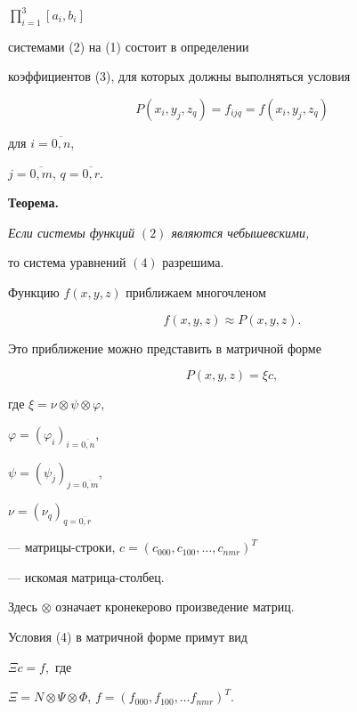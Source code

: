 $\prod\limits_{i=1}^3[a_i,b_i]$


системами (2) на (1) состоит в определении


коэффициентов (3), для которых должны выполняться условия


\begin{equation}


P(x_i,y_j,z_q)=f_{ijq}=f(x_i,y_j,z_q)


\end{equation}


для $i=\overline{0,n}$,


$j=\overline{0,m}$, $q=\overline{0,r}$.


\medskip





{\bf Теорема.}


{\it Если системы функций $(2)$ являются чебышевскими,


то система уравнений $(4)$ разрешима.}


\medskip





Функцию $f(x,y,z)$ приближаем многочленом


$$


f(x,y,z)\approx P(x,y,z).


$$


Это приближение можно представить в матричной форме


\begin{equation}


P(x,y,z)=\xi c,


\end{equation}


где $\xi=\nu\otimes\psi\otimes\varphi$,


$\varphi=(\varphi_i)_{i=\overline{0,n}}$,


$\psi=(\psi_j)_{j=\overline{0,m}}$,


$\nu=(\nu_q)_{q=\overline{0,r}}$


--- матрицы-строки, $c=(c_{000},c_{100},\dotsc, c_{nmr})^{T}$


--- искомая матрица-столбец.


Здесь $\otimes$ означает кронекерово произведение матриц.


Условия (4) в матричной форме примут вид


$\Xi c=f,$ где


$\Xi=N\otimes\Psi\otimes\Phi$, $f=(f_{000},f_{100},\dotsc f_{nmr})^{T}$.


